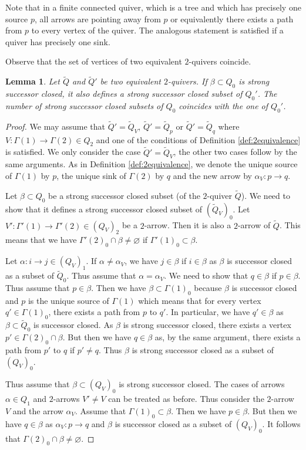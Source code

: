 \documentclass{amsart}
\newtheorem{lemma}[theorem]{Lemma}
\numberwithin{equation}{section}
\begin{document}
Note that in a finite connected quiver, which is a tree and which has precisely one source $p$, all arrows are pointing away from $p$ or equivalently there exists a path from $p$ to every vertex of the quiver. The analogous statement is satisfied if a quiver has precisely one sink. 

Observe that the set of vertices of two equivalent $2$-quivers coincide. 



\begin{lemma}\label{lem:2equivalence}
Let $\tilde Q$ and $\tilde Q'$ be two equivalent $2$-quivers. If $\beta\subset Q_0$ is strong successor closed, it also defines a strong successor closed subset of $Q_0'$.
The number of strong successor closed subsets of $Q_0$ coincides with the one of $ Q_0'$.
\end{lemma}
\begin{proof}
We may assume that $\tilde Q'=\tilde Q_V$, $\tilde Q'=\tilde Q_p$ or $\tilde Q'=\tilde Q_q$ where $V:\Gamma(1)\to\Gamma(2)\in Q_2$ and one of the conditions of Definition \ref{def:2equivalence} is satisfied. We only consider the case $\tilde Q'=\tilde Q_V$, the other two cases follow by the same arguments. As in Definition \ref{def:2equivalence}, we denote the unique source of $\Gamma(1)$ by $p$, the unique sink of $\Gamma(2)$ by $q$ and the new arrow by $\alpha_V:p\to q$.

Let $\beta\subset Q_0$ be a strong successor closed subset (of the $2$-quiver $\tilde Q$). We need to show that it defines a strong successor closed subset of $(\tilde Q_V)_0$.
Let $V':\Gamma'(1)\to\Gamma'(2)\in (Q_V)_2$ be a  $2$-arrow. Then it is also a $2$-arrow of $\tilde Q$. This means that  we have $\Gamma'(2)_0\cap \beta\neq\varnothing$ if $\Gamma'(1)_0\subset \beta$. 
 
Let $\alpha:i\to j\in (Q_V)_1$. If $\alpha\neq\alpha_V$, we have $j\in \beta$ if $i\in\beta$ as $\beta$ is successor closed as a subset of $\tilde Q_0$. Thus assume that $\alpha=\alpha_V$. We need to show that $q\in\beta$ if $p\in\beta$. Thus assume that $p\in\beta$. Then we have $\beta\subset\Gamma(1)_0$ because $\beta$ is successor closed and $p$ is the unique source of $\Gamma(1)$ which means that for every vertex $q'\in\Gamma(1)_0$, there exists a path from $p$ to $q'$. In particular, we have $q'\in\beta$ as $\beta\subset \tilde Q_0$ is successor closed.
As $\beta$ is strong successor closed, there exists a vertex $p'\in\Gamma(2)_0\cap\beta$. But then we have $q\in\beta$ as, by the same argument, there exists a path from $p'$ to $q$ if $p'\neq q$. Thus $\beta$ is strong successor closed as a subset of $(Q_V)_0$.


Thus assume that $\beta\subset (Q_V)_0$ is strong successor closed. The cases of arrows $\alpha\in Q_1$ and $2$-arrows $V'\neq V$ can be treated as before. Thus consider the $2$-arrow $V$ and the arrow $\alpha_V$. Assume that $\Gamma(1)_0\subset\beta$. Then we have $p\in\beta$. But then we have $q\in\beta$ as $\alpha_V:p\to q$ and $\beta$ is successor closed as a subset of $(Q_V)_0$. It follows that $\Gamma(2)_0\cap\beta\neq\varnothing$.
\end{proof}
\end{document}
